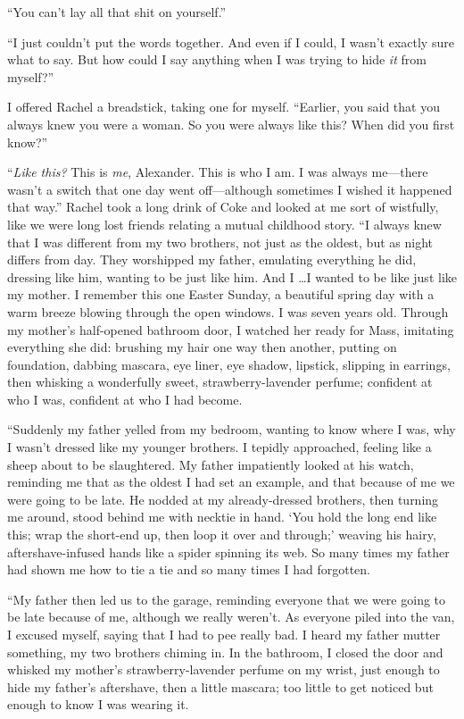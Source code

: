``You can't lay all that shit on yourself.''

``I just couldn't put the words together. And even if I could, I wasn't
exactly sure what to say. But how could I say anything when I was trying
to hide \emph{it} from myself?''

I offered Rachel a breadstick, taking one for myself. ``Earlier, you
said that you always knew you were a woman. So you were always like
this? When did you first know?''

``\emph{Like this?} This is \emph{me}, Alexander. This is who I am. I
was always me---there wasn't a switch that one day went off---although
sometimes I wished it happened that way.'' Rachel took a long drink of
Coke and looked at me sort of wistfully, like we were long lost friends
relating a mutual childhood story. ``I always knew that I was different
from my two brothers, not just as the oldest, but as night differs from
day. They worshipped my father, emulating everything he did, dressing
like him, wanting to be just like him. And I \ldots I wanted to be like
just like my mother. I remember this one Easter Sunday, a beautiful
spring day with a warm breeze blowing through the open windows. I was
seven years old. Through my mother's half-opened bathroom door, I
watched her ready for Mass, imitating everything she did: brushing my
hair one way then another, putting on foundation, dabbing mascara, eye
liner, eye shadow, lipstick, slipping in earrings, then whisking a
wonderfully sweet, strawberry-lavender perfume; confident at who I was,
confident at who I had become.

``Suddenly my father yelled from my bedroom, wanting to know where I
was, why I wasn't dressed like my younger brothers. I tepidly
approached, feeling like a sheep about to be slaughtered. My father
impatiently looked at his watch, reminding me that as the oldest I had
set an example, and that because of me we were going to be late. He
nodded at my already-dressed brothers, then turning me around, stood
behind me with necktie in hand. `You hold the long end like this; wrap
the short-end up, then loop it over and through;' weaving his hairy,
aftershave-infused hands like a spider spinning its web. So many times
my father had shown me how to tie a tie and so many times I had
forgotten.

``My father then led us to the garage, reminding everyone that we were
going to be late because of me, although we really weren't. As everyone
piled into the van, I excused myself, saying that I had to pee really
bad. I heard my father mutter something, my two brothers chiming in. In
the bathroom, I closed the door and whisked my mother's
strawberry-lavender perfume on my wrist, just enough to hide my father's
aftershave, then a little mascara; too little to get noticed but enough
to know I was wearing it.

